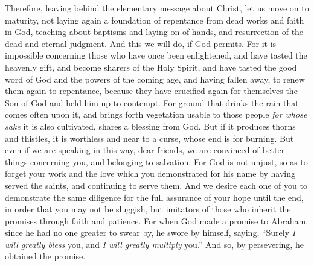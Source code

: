\begin{biblechapter} %
 Therefore, leaving behind the elementary message about Christ, let us move on to maturity, not laying again a foundation of repentance from dead works and faith in God,
\verse teaching about baptisms and laying on of hands, and resurrection of the dead and eternal judgment.
\verse And this we will do, if God permits.
\verse For it is impossible concerning those who have once been enlightened, and have tasted the heavenly gift, and become sharers of the Holy Spirit,
\verse and have tasted the good word of God and the powers of the coming age,
\verse and having fallen away, to renew them again to repentance, because they have crucified again for themselves the Son of God and held him up to contempt.
\verse For ground that drinks the rain that comes often upon it, and brings forth vegetation usable to those people \textit{for whose sake} it is also cultivated, shares a blessing from God.
\verse But if it produces thorns and thistles, it is worthless and near to a curse, whose end is for burning.
\verse But even if we are speaking in this way, dear friends, we are convinced of better things concerning you, and belonging to salvation.
\verse For God is not unjust, so as to forget your work and the love which you demonstrated for his name by having served the saints, and continuing to serve them.
\verse And we desire each one of you to demonstrate the same diligence for the full assurance of your hope until the end,
\verse in order that you may not be sluggish, but imitators of those who inherit the promises through faith and patience.
 For when God made a promise to Abraham, since he had no one greater to swear by, he swore by himself,
\verse saying, “Surely \textit{I will greatly bless} you, and \textit{I will greatly multiply} you.”
\verse And so, by persevering, he obtained the promise.

\end{biblechapter}

